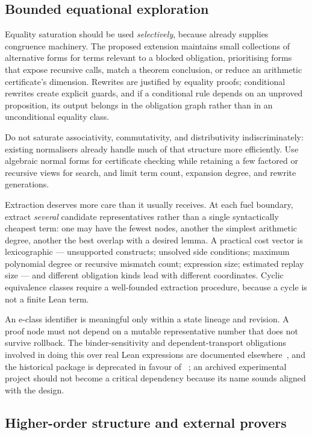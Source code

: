 \subsection{Bounded equational exploration}

Equality saturation should be used \emph{selectively}, because \grind{} already
supplies congruence machinery. The proposed extension maintains small
collections of alternative forms for terms relevant to a blocked obligation,
prioritising forms that expose recursive calls, match a theorem conclusion, or
reduce an arithmetic certificate's dimension. Rewrites are justified by equality
proofs; conditional rewrites create explicit guards, and if a conditional rule
depends on an unproved proposition, its output belongs in the obligation graph
rather than in an unconditional equality class.

Do not saturate associativity, commutativity, and distributivity
indiscriminately: existing normalisers already handle much of that structure
more efficiently. Use algebraic normal forms for certificate checking while
retaining a few factored or recursive views for search, and limit term count,
expansion degree, and rewrite generations.

Extraction deserves more care than it usually receives. At each fuel boundary,
extract \emph{several} candidate representatives rather than a single
syntactically cheapest term: one may have the fewest nodes, another the simplest
arithmetic degree, another the best overlap with a desired lemma. A practical
cost vector is lexicographic --- unsupported constructs; unsolved side
conditions; maximum polynomial degree or recursive mismatch count; expression
size; estimated replay size --- and different obligation kinds lead with
different coordinates. Cyclic equivalence classes require a well-founded
extraction procedure, because a cycle is not a finite Lean term.

An e-class identifier is meaningful only within a state lineage and revision. A
proof node must not depend on a mutable representative number that does not
survive rollback. The binder-sensitivity and dependent-transport obligations
involved in doing this over real Lean expressions are documented
elsewhere~\cite{egg-lean-paper,eqsat-paper}, and the historical 
package is deprecated in favour of \grind{}~\cite{lean-egg}; an archived
experimental project should not become a critical dependency because its name
sounds aligned with the design.

\subsection{Higher-order structure and external provers}

